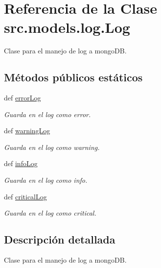\hypertarget{classsrc_1_1models_1_1log_1_1_log}{\section{Referencia de la Clase src.\-models.\-log.\-Log}
\label{classsrc_1_1models_1_1log_1_1_log}
}


Clase para el manejo de log a mongo\-D\-B.  


\subsection*{Métodos públicos estáticos}
\begin{DoxyCompactItemize}
\item 
def \hyperlink{classsrc_1_1models_1_1log_1_1_log_a347cbfc00b404f1cb553b1c863d9bdd0}{error\-Log}
\begin{DoxyCompactList}\small\item\em Guarda en el log como error. \end{DoxyCompactList}\item 
def \hyperlink{classsrc_1_1models_1_1log_1_1_log_a7f653647ca961119b9ee9347c66da254}{warning\-Log}
\begin{DoxyCompactList}\small\item\em Guarda en el log como warning. \end{DoxyCompactList}\item 
def \hyperlink{classsrc_1_1models_1_1log_1_1_log_a8d817ce0771f7e69942f3110319bc376}{info\-Log}
\begin{DoxyCompactList}\small\item\em Guarda en el log como info. \end{DoxyCompactList}\item 
def \hyperlink{classsrc_1_1models_1_1log_1_1_log_a17c3921b7fc18ea0302218d55390215e}{critical\-Log}
\begin{DoxyCompactList}\small\item\em Guarda en el log como critical. \end{DoxyCompactList}\end{DoxyCompactItemize}


\subsection{Descripción detallada}
Clase para el manejo de log a mongo\-D\-B. 




